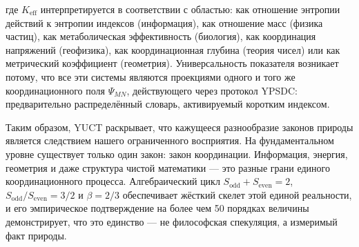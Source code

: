 \documentclass[12pt]{article}
\newcommand{\Sodd}{S_{\mathrm{odd}}}
\newcommand{\Seven}{S_{\mathrm{even}}}
\begin{document}
	где \(K_{\mathrm{eff}}\) интерпретируется в соответствии с областью: как отношение энтропии действий к энтропии индексов (информация), как отношение масс (физика частиц), как метаболическая эффективность (биология), как координация напряжений (геофизика), как координационная глубина (теория чисел) или как метрический коэффициент (геометрия). Универсальность показателя возникает потому, что все эти системы являются проекциями одного и того же координационного поля \(\Psi_{MN}\), действующего через протокол YPSDC: предварительно распределённый словарь, активируемый коротким индексом.
	
	Таким образом, YUCT раскрывает, что кажущееся разнообразие законов природы является следствием нашего ограниченного восприятия. На фундаментальном уровне существует только один закон: закон координации. Информация, энергия, геометрия и даже структура чистой математики — это разные грани единого координационного процесса. Алгебраический цикл \(\Sodd + \Seven = 2\), \(\Sodd/\Seven = 3/2\) и \(\beta = 2/3\) обеспечивает жёсткий скелет этой единой реальности, и его эмпирическое подтверждение на более чем 50 порядках величины демонстрирует, что это единство — не философская спекуляция, а измеримый факт природы.
	
\end{document}
